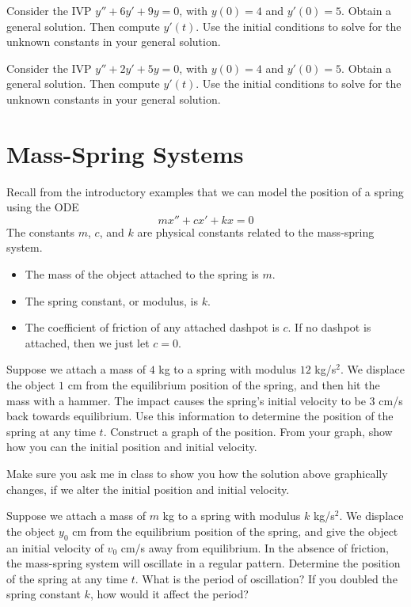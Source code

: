 \begin{problem}
 Consider the IVP $y''+6y'+9y=0$, with $y(0)=4$ and $y'(0)=5$.  Obtain a general solution. Then compute $y'(t)$. Use the initial conditions to solve for the unknown constants in your general solution. 
\end{problem}

\begin{problem}
 Consider the IVP $y''+2y'+5y=0$, with $y(0)=4$ and $y'(0)=5$.  Obtain a general solution. Then compute $y'(t)$. Use the initial conditions to solve for the unknown constants in your general solution. 
\end{problem}


\section{Mass-Spring Systems}
 Recall from the introductory examples that we can model the position of a spring using the ODE $$mx''+cx'+kx=0$$
 The constants $m$, $c$, and $k$ are physical constants related to the mass-spring system.
\begin{itemize}
 \item The mass of the object attached to the spring is $m$.
 \item The spring constant, or modulus, is $k$.
 \item The coefficient of friction of any attached dashpot is $c$. If no dashpot is attached, then we just let $c=0$.
\end{itemize}

\begin{problem}
 Suppose we attach a mass of $4$ kg to a spring with modulus $12$ kg/s$^2$. We displace the object $1$ cm from the equilibrium position of the spring, and then hit the mass with a hammer. The impact causes the spring's initial velocity to be 3 cm/s back towards equilibrium.  Use this information to determine the position of the spring at any time $t$. Construct a graph of the position. From your graph, show how you can the initial position and initial velocity.
\end{problem}

Make sure you ask me in class to show you how the solution above graphically changes, if we alter the initial position and initial velocity.

\begin{problem}
 Suppose we attach a mass of $m$ kg to a spring with modulus $k$ kg/s$^2$. We displace the object $y_0$ cm from the equilibrium position of the spring, and give the object an initial velocity of $v_0$ cm/s away from equilibrium. In the absence of friction, the mass-spring system will oscillate in a regular pattern. Determine the position of the spring at any time $t$.  What is the period of oscillation? If you doubled the spring constant $k$, how would it affect the period?
\end{problem}

